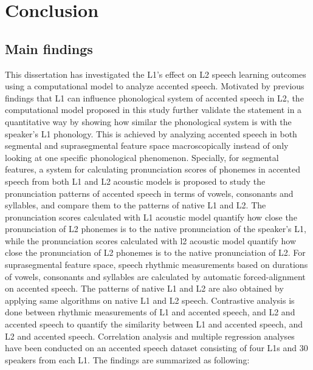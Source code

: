\chapter{Conclusion}
\label{conclusion}

\section{Main findings}

This dissertation has investigated the L1's effect on L2 speech learning outcomes using a computational model to analyze accented speech. Motivated by previous findings that L1 can influence phonological system of accented speech in L2, the computational model proposed in this study further validate the statement in a quantitative way by showing how similar the phonological system is with the speaker's L1 phonology. This is achieved by analyzing accented speech in both segmental and suprasegmental feature space macroscopically instead of only looking at one specific phonological phenomenon. Specially, for segmental features, a system for calculating pronunciation scores of phonemes in accented speech from both L1 and L2 acoustic models is proposed to study the pronunciation patterns of accented speech in terms of vowels, consonants and syllables, and compare them to the patterns of native L1 and L2. The pronunciation scores calculated with L1 acoustic model quantify how close the pronunciation of L2 phonemes is to the native pronunciation of the speaker's L1, while the pronunciation scores calculated with l2 acoustic model quantify how close the pronunciation of L2 phonemes is to the native pronunciation of L2. For suprasegmental feature space, speech rhythmic measurements based on durations of vowels, consonants and syllables are calculated by automatic forced-alignment on accented speech. The patterns of native L1 and L2 are also obtained by applying same algorithms on native L1 and L2 speech. Contrastive analysis is done between rhythmic measurements of L1 and accented speech, and L2 and accented speech to quantify the similarity between L1 and accented speech, and L2 and accented speech. Correlation analysis and multiple regression analyses have been conducted on an accented speech dataset consisting of four L1s and 30 speakers from each L1. The findings are summarized as following:

